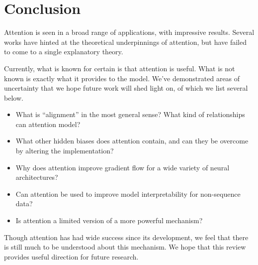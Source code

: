 \documentclass{article}
\begin{document}
\section{Conclusion}

Attention is seen in a broad range of applications, with impressive results. Several works have hinted at the theoretical underpinnings of attention, but have failed to come to a single explanatory theory.

Currently, what is known for certain is that attention is useful. What is not known is exactly what it provides to the model. We've demonstrated areas of uncertainty that we hope future work will shed light on, of which we list several below.
\begin{itemize}
    \item What is ``alignment'' in the most general sense? What kind of relationships can attention model?
    \item What other hidden biases does attention contain, and can they be overcome by altering the implementation?
    \item Why does attention improve gradient flow for a wide variety of neural architectures?
    \item Can attention be used to improve model interpretability for non-sequence data?
    \item Is attention a limited version of a more powerful mechanism?
\end{itemize}
Though attention has had wide success since its development, we feel that there is still much to be understood about this mechanism. We hope that this review provides useful direction for future research.



\end{document}
